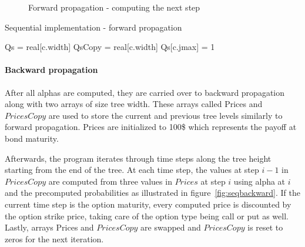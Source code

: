 \begin{figure}[H]
    \centering
    \def\svgwidth{0.5\textwidth}
	\caption{Forward propagation - computing the next step}
    
	\label{fig:seqforward}
\end{figure}

\begin{algorithm}[H]
    \DontPrintSemicolon
    \setcounter{AlgoLine}{17}
    \caption{Sequential implementation - forward propagation\label{alg:sequential-forward}}
    
    Qs = real[c.width]\;
    QsCopy = real[c.width]\;
    Qs[c.jmax] = 1
    \;
\end{algorithm}

\pagebreak
\paragraph{Backward propagation}
After all alphas are computed, they are carried over to backward propagation along with two arrays of size tree width. These arrays called Prices and $PricesCopy$ are used to store the current and previous tree levels similarly to forward propagation. Prices are initialized to 100\$ which represents the payoff at bond maturity.

Afterwards, the program iterates through time steps along the tree height starting from the end of the tree. At each time step, the values at step $i-1$ in $PricesCopy$ are computed from three values in $Prices$ at step $i$ using alpha at $i$ and the precomputed probabilities as illustrated in figure~\ref{fig:seqbackward}. If the current time step is the option maturity, every computed price is discounted by the option strike price, taking care of the option type being call or put as well. Lastly, arrays Prices and $PricesCopy$ are swapped and $PricesCopy$ is reset to zeros for the next iteration.

